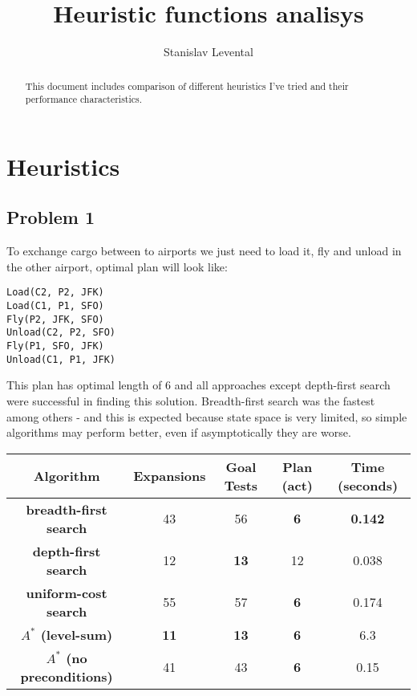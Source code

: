 \documentclass[11pt]{article}
\title{\LARGE \bf Heuristic functions analisys}
\author{Stanislav Levental}
\begin{document}
\maketitle

\begin{abstract}

This document includes comparison of different heuristics I've tried and their performance characteristics.

\end{abstract}

\section{Heuristics}

\subsection{Problem 1}

To exchange cargo between to airports we just need to load it, fly and unload in the other airport, optimal plan will look like:
\begin{lstlisting}[frame=single]
Load(C2, P2, JFK)
Load(C1, P1, SFO)
Fly(P2, JFK, SFO)
Unload(C2, P2, SFO)
Fly(P1, SFO, JFK)
Unload(C1, P1, JFK)
\end{lstlisting}

This plan has optimal length of 6 and all approaches except depth-first search were successful in finding this solution. Breadth-first search was the fastest among others - and this is expected because state space is very limited, so simple algorithms may perform better, even if asymptotically they are worse.

\begin{center}
 \begin{tabular}{||c c c c c ||} 
 \hline
 Algorithm & Expansions & Goal Tests & Plan (act) & Time (seconds) \\ [0.5ex] 
 \hline\hline
 \textbf{breadth-first search} & 43 & 56  & \textbf{6} & \textbf{0.142} \\ 
 \hline
 \textbf{depth-first search} & 12 & \textbf{13}  & 12 & 0.038 \\ 
 \hline
 \textbf{uniform-cost search} & 55 & 57  & \textbf{6} & 0.174 \\ 
 \hline
	\textbf{$A^{*}$ (level-sum)} & \textbf{11} & \textbf{13} & \textbf{6} & 6.3 \\ 
 \hline
	\textbf{$A^{*}$ (no preconditions)} & 41	 & 43 & \textbf{6} & 0.15 \\ 
 \hline
\end{tabular}
\end{center}
\end{document}
